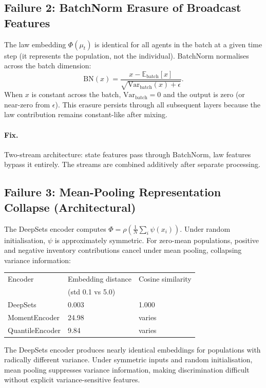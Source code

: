 \documentclass[11pt,a4paper]{article}
\newcommand{\E}{\mathbb{E}}
\newcommand{\mup}{\mu_t}
\begin{document}
\subsection{Failure 2: BatchNorm Erasure of Broadcast Features}

The law embedding $\Phi(\mup)$ is identical for all agents in the batch at a given time step (it represents the population, not the individual). BatchNorm normalises across the batch dimension:
\[
  \text{BN}(x) = \frac{x - \E_{\text{batch}}[x]}{\sqrt{\text{Var}_{\text{batch}}(x) + \epsilon}}.
\]
When $x$ is constant across the batch, $\text{Var}_{\text{batch}} = 0$ and the output is zero (or near-zero from $\epsilon$). This erasure persists through all subsequent layers because the law contribution remains constant-like after mixing.

\paragraph{Fix.} Two-stream architecture: state features pass through BatchNorm, law features bypass it entirely. The streams are combined additively after separate processing.

\subsection{Failure 3: Mean-Pooling Representation Collapse (Architectural)}

The DeepSets encoder computes $\Phi = \rho(\frac{1}{N}\sum_i \psi(x_i))$. Under random initialisation, $\psi$ is approximately symmetric. For zero-mean populations, positive and negative inventory contributions cancel under mean pooling, collapsing variance information:

\begin{center}
\begin{tabular}{lll}
\toprule
Encoder & Embedding distance & Cosine similarity \\
& (std 0.1 vs 5.0) & \\
\midrule
DeepSets & 0.003 & 1.000 \\
MomentEncoder & 24.98 & varies \\
QuantileEncoder & 9.84 & varies \\
\bottomrule
\end{tabular}
\end{center}

The DeepSets encoder produces nearly identical embeddings for populations with radically different variance. Under symmetric inputs and random initialisation, mean pooling suppresses variance information, making discrimination difficult without explicit variance-sensitive features.
\end{document}
